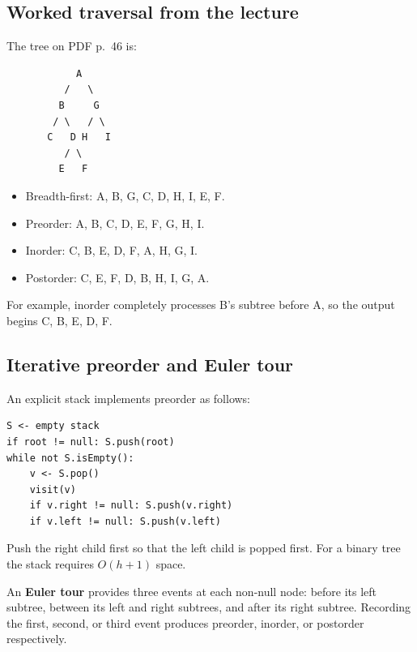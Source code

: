 \documentclass[11pt]{article}
\begin{document}
\subsection{Worked traversal from the lecture}
The tree on PDF p.\ 46 is:
\begin{lstlisting}
            A
          /   \
         B     G
        / \   / \
       C   D H   I
          / \
         E   F
\end{lstlisting}
\begin{itemize}
\item Breadth-first: A, B, G, C, D, H, I, E, F.
\item Preorder: A, B, C, D, E, F, G, H, I.
\item Inorder: C, B, E, D, F, A, H, G, I.
\item Postorder: C, E, F, D, B, H, I, G, A.
\end{itemize}
For example, inorder completely processes B's subtree before A, so the output begins C, B, E, D, F.

\subsection{Iterative preorder and Euler tour}
An explicit stack implements preorder as follows:
\begin{lstlisting}
S <- empty stack
if root != null: S.push(root)
while not S.isEmpty():
    v <- S.pop()
    visit(v)
    if v.right != null: S.push(v.right)
    if v.left != null: S.push(v.left)
\end{lstlisting}
Push the right child first so that the left child is popped first. For a binary tree the stack requires $O(h+1)$ space.

An \textbf{Euler tour} provides three events at each non-null node: before its left subtree, between its left and right subtrees, and after its right subtree. Recording the first, second, or third event produces preorder, inorder, or postorder respectively.
\end{document}

